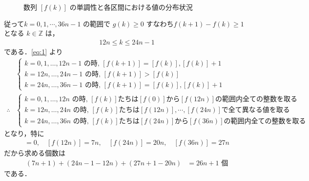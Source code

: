 \documentclass[../../main.tex]{subfiles}
\begin{document}
\begin{figure}[htb]
  \caption{数列 $[f(k)]$ の単調性と各区間における値の分布状況}
  \label{fig:fk_integer_value_distribution_clean}
\end{figure}

従って$k=0,1,\cdots,36n-1$ の範囲で $g(k) \ge 0$ すなわち$f(k+1)-f(k) \ge 1$ となる $k \in \mathbb{Z}$ は，
\begin{align}
  12n \le k \le 24n - 1 \label{eq:4}
\end{align}
である．\cref{eq:1} より
\begin{align}
  &
  \begin{cases}
    k = 0, 1, \dots, 12n-1 \text{ の時, } [f(k+1)] = [f(k)], [f(k)] + 1 \\
    k = 12n, \dots, 24n-1 \text{ の時, }  [f(k+1)] > [f(k)] \\
    k = 24n, \dots, 36n-1 \text{ の時, }  [f(k+1)] = [f(k)], [f(k)] + 1
  \end{cases} \\
  \therefore
  &
  \begin{cases}
    k = 0, 1, \dots, 12n \text{ の時, $[f(k)]$たちは$[f(0)]$から$[f(12n)]$の範囲内全ての整数を取る} \\
    k = 12n, \dots, 24n \text{ の時, $[f(k)]$たちは$[f(12n)],\cdots,[f(24n)]$で全て異なる値を取る} \\
    k = 24n, \dots, 36n \text{ の時, $[f(k)]$たちは$[f(24n)]$から$[f(36n)]$の範囲内全ての整数を取る}
  \end{cases}
\end{align}
となり，特に
\begin{align}
  [f(0)] = 0, \quad [f(12n)] = 7n, \quad [f(24n)] = 20n, \quad [f(36n)] = 27n
\end{align}
だから求める個数は
\begin{align}
  (7n + 1) + (24n - 1 - 12n) + (27n + 1 - 20n) &= 26n + 1 \text{ 個}
\end{align}
である．
\end{document}
